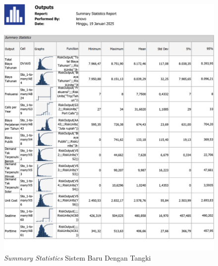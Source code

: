 \begin{figure}[!ht]
    \centering
    \includegraphics[width=\linewidth,height=\textheight,keepaspectratio]{lampiran/summary-tangki.jpg}
    \caption*{\emph{Summary Statistics} Sistem Baru Dengan Tangki}
\end{figure}